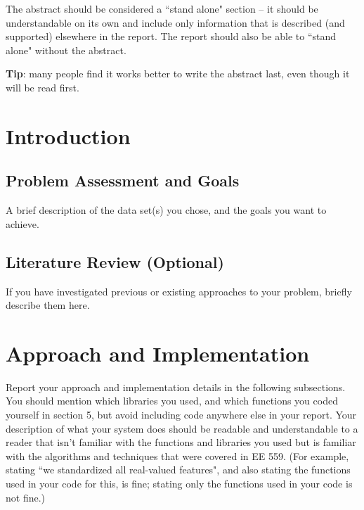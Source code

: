 \documentclass[singlecolumn]{article}
\begin{document}
The abstract should be considered a ``stand alone" section – it should be understandable on its own and include only information that is described (and supported) elsewhere in the report. The report should also be able to ``stand alone" without the abstract.
 
\textbf{Tip}: many people find it works better to write the abstract last, even though it will be read first. 

\section{Introduction}
\subsection{Problem Assessment and Goals}
A brief description of the data set(s) you chose, and the goals you want to achieve.

\subsection{Literature Review (Optional)}
If you have investigated previous or existing approaches to your problem, briefly describe them here. 

\section{Approach and Implementation}
Report your approach and implementation details in the following subsections. You should mention which libraries you used, and which functions you coded yourself in section 5, but avoid including code anywhere else in your report. Your description of what your system does should be readable and understandable to a reader that isn't familiar with the functions and libraries you used but is familiar with the algorithms and techniques that were covered in EE 559. (For example, stating ``we standardized all real-valued features", and also stating the functions used in your code for this, is fine; stating only the functions used in your code is not fine.) \\
\end{document}
